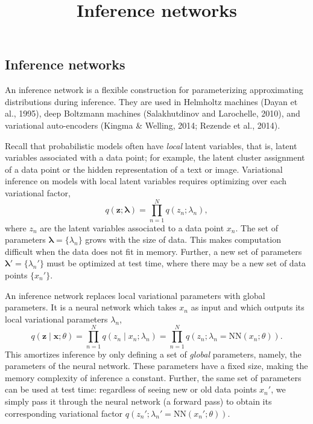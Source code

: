 \title{Inference networks}

\subsection{Inference networks}

An inference network is a flexible construction for parameterizing
approximating distributions during inference.
They are used in Helmholtz machines (Dayan et al., 1995), deep
Boltzmann machines (Salakhutdinov and Larochelle, 2010), and
variational auto-encoders (Kingma & Welling, 2014; Rezende et al.,
2014).

Recall that probabilistic models often have \emph{local} latent
variables, that is, latent variables associated with a data point; for
example, the latent cluster assignment of a data point or the hidden
representation of a text or image.
Variational
inference on models with local latent variables
requires optimizing over each variational factor,
\begin{equation*}
q(\mathbf{z}; \mathbf{\lambda}) = \prod_{n=1}^N q(z_n; \lambda_n),
\end{equation*}
where $z_n$ are the latent variables associated to a data point $x_n$.
The set of parameters $\mathbf{\lambda}=\{\lambda_n\}$ grows with the
size of data. This makes computation difficult when the data
does not fit in memory.
Further, a new set of parameters $\mathbf{\lambda}'=\{\lambda_n'\}$
must be optimized at test time, where there may be a new set of data
points $\{x_n'\}$.

An inference network replaces local variational parameters with global
parameters. It is a neural network
which takes $x_n$ as input and which outputs its local variational parameters
$\lambda_n$,
\begin{equation*}
q(\mathbf{z}\mid \mathbf{x}; \theta)
= \prod_{n=1}^N q(z_n \mid x_n; \lambda_n)
= \prod_{n=1}^N q(z_n; \lambda_n = \mathrm{NN}(x_n; \theta)).
\end{equation*}
This amortizes inference by only defining a set of \emph{global} parameters,
namely, the parameters of the neural network. These parameters have a
fixed size, making the memory complexity of inference a constant.
Further, the same set of parameters can be used at test time:
regardless of seeing new or old data points $x_n'$, we simply pass it
through the neural network (a forward pass) to obtain its
corresponding variational factor $q(z_n'; \lambda_n' =
\mathrm{NN}(x_n'; \theta))$.

